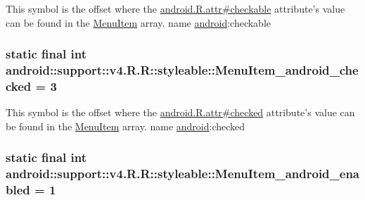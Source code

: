 This symbol is the offset where the \hyperlink{}{android.R.attr\#checkable} attribute's value can be found in the \hyperlink{classandroid_1_1support_1_1v4_1_1_r_1_1styleable_05493a7eeaa2bff09c4fbacbfb671ccc}{MenuItem} array.  name \hyperlink{namespaceandroid}{android}:checkable \hypertarget{classandroid_1_1support_1_1v4_1_1_r_1_1styleable_2e34104aed0ac276e13e97441de38b68}{
\subsubsection[{MenuItem\_\-android\_\-checked}]{\setlength{\rightskip}{0pt plus 5cm}static final int android::support::v4.R.R::styleable::MenuItem\_\-android\_\-checked = 3}}
\label{classandroid_1_1support_1_1v4_1_1_r_1_1styleable_2e34104aed0ac276e13e97441de38b68}


This symbol is the offset where the \hyperlink{}{android.R.attr\#checked} attribute's value can be found in the \hyperlink{classandroid_1_1support_1_1v4_1_1_r_1_1styleable_05493a7eeaa2bff09c4fbacbfb671ccc}{MenuItem} array.  name \hyperlink{namespaceandroid}{android}:checked \hypertarget{classandroid_1_1support_1_1v4_1_1_r_1_1styleable_202fdf83a524efca222f4f5d085c0628}{
\subsubsection[{MenuItem\_\-android\_\-enabled}]{\setlength{\rightskip}{0pt plus 5cm}static final int android::support::v4.R.R::styleable::MenuItem\_\-android\_\-enabled = 1}}
\label{classandroid_1_1support_1_1v4_1_1_r_1_1styleable_202fdf83a524efca222f4f5d085c0628}


